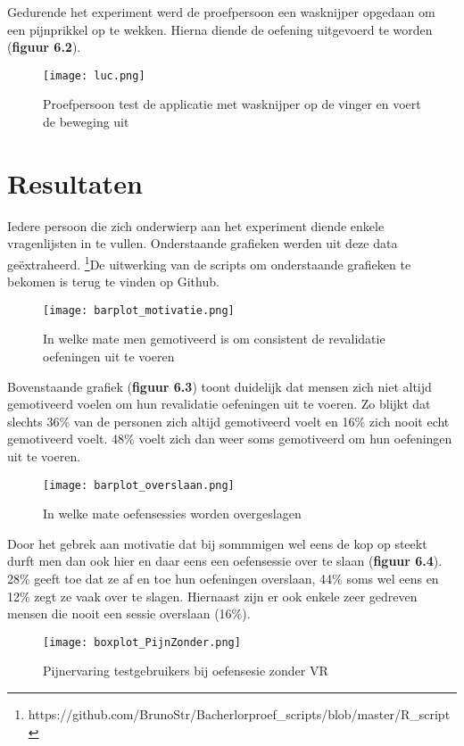 Gedurende het experiment werd de proefpersoon een wasknijper opgedaan om een pijnprikkel op te wekken. Hierna diende de oefening uitgevoerd te worden (\textbf{figuur 6.2}). 

\begin{figure}[h]
    \centering
    \texttt{[image: luc.png]}
    \caption{Proefpersoon test de applicatie met wasknijper op de vinger en voert de beweging uit}
    \label{figuur 6.2}
\end{figure}

\newpage

\section{Resultaten}
Iedere persoon die zich onderwierp aan het experiment diende enkele vragenlijsten in te vullen. Onderstaande grafieken werden uit deze data geëxtraheerd.
\footnote{https://github.com/BrunoStr/Bacherlorproef\_scripts/blob/master/R\_script}De uitwerking van de scripts om onderstaande grafieken te bekomen is terug te vinden op Github.

\begin{figure}[h]
    \centering
    \texttt{[image: barplot\_motivatie.png]}
    \caption{In welke mate men gemotiveerd is om consistent de revalidatie oefeningen uit te voeren}
    \label{figuur 6.3}
\end{figure}

Bovenstaande grafiek (\textbf{figuur 6.3}) toont duidelijk dat mensen zich niet altijd gemotiveerd voelen om hun revalidatie oefeningen uit te voeren. Zo blijkt dat slechts 36\% van de personen zich altijd gemotiveerd voelt en 16\% zich nooit echt gemotiveerd voelt. 48\% voelt zich dan weer soms gemotiveerd om hun oefeningen uit te voeren.

\begin{figure}[h]
    \centering
    \texttt{[image: barplot\_overslaan.png]}
    \caption{In welke mate oefensessies worden overgeslagen}
    \label{figuur 6.4}
\end{figure}

Door het gebrek aan motivatie dat bij sommmigen wel eens de kop op steekt durft men dan ook hier en daar eens een oefensessie over te slaan (\textbf{figuur 6.4}). 28\% geeft toe dat ze af en toe hun oefeningen overslaan, 44\% soms wel eens en 12\% zegt ze vaak over te slagen. Hiernaast zijn er ook enkele zeer gedreven mensen die nooit een sessie overslaan (16\%).

\begin{figure}[h]
    \centering
    \texttt{[image: boxplot\_PijnZonder.png]}
    \caption{Pijnervaring testgebruikers bij oefensesie zonder VR}
    \label{figuur 6.5}
\end{figure}

